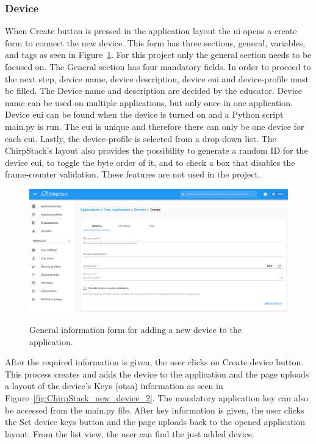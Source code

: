 \subsubsection{Device}
When Create button is pressed in the application layout the \gls{ui} opens a create form to connect the new device.
This form has three sections, general, variables, and tags as seen in Figure~\ref{fig:ChirpStack_new_device}.
For this project only the general section needs to be focused on.
The General section has four mandatory fields.
In order to proceed to the next step, device name, device description, device \gls{eui} and device-profile must be filled.
The Device name and description are decided by the educator.
Device name can be used on multiple applications, but only once in one application.
Device \gls{eui} can be found when the device is turned on and a Python script main.py is run.
The \gls{eui} is unique and therefore there can only be one device for each \gls{eui}.
Lastly, the device-profile is selected from a drop-down list.
The ChirpStack's layout also provides the possibility to generate a random ID for the device \gls{eui}, to toggle the byte order of it, and to check a box that disables the frame-counter validation.
These features are not used in the project.

\clearpage

\begin{figure}[ht]
  \centering
  {\includegraphics[width=\textwidth]{illustration/ChirpStack_new_device.png}}
  \caption{General information form for adding a new device to the application.}
  \label{fig:ChirpStack_new_device}
\end{figure}

After the required information is given, the user clicks on Create device button.
This process creates and adds the device to the application and the page uploads a layout of the device's Keys (\gls{otaa}) information as seen in Figure~\ref{fig:ChirpStack_new_device_2}.
The mandatory application key can also be accessed from the main.py file.
After key information is given, the user clicks the Set device keys button and the page uploads back to the opened application layout.
From the list view, the user can find the just added device.

